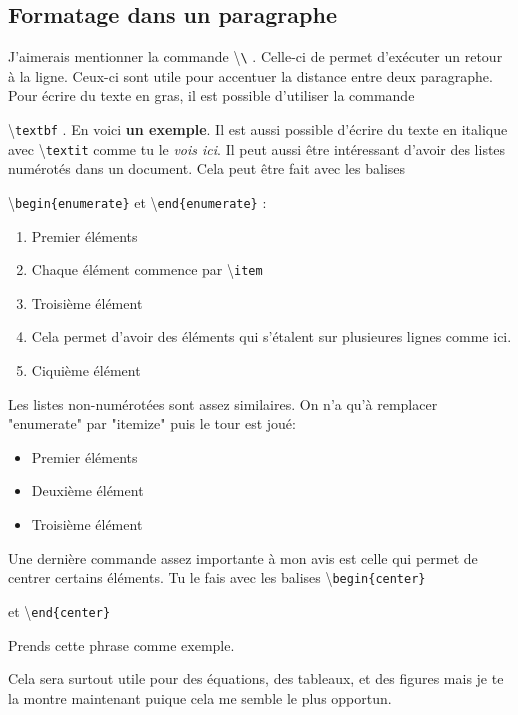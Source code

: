 \documentclass[a4paper, 10pt]{article}
\newcommand{\command}[1]{
	\colorbox{codebackground}{\scriptsize{\textbackslash}\texttt{#1}}
}
\begin{document}
\subsection{Formatage dans un paragraphe}

J'aimerais mentionner la commande \command{\textbackslash}. Celle-ci de
permet d'exécuter un retour à la ligne. Ceux-ci sont utile pour accentuer la
distance entre deux paragraphe. \\

Pour écrire du texte en gras, il est possible d'utiliser la commande
\command{textbf}. En voici \textbf{un exemple}. Il est aussi possible
d'écrire du texte en italique avec \command{textit} comme tu le
\textit{vois ici}. Il peut aussi être intéressant d'avoir des listes numérotés
dans un document. Cela peut être fait avec les balises
\command{begin\{enumerate\}} et \command{end\{enumerate\}}:

\begin{enumerate}
	\item Premier éléments
	\item Chaque élément commence par \command{item}
	\item Troisième élément
	\item Cela permet d'avoir des
		éléments qui s'étalent
		sur plusieures lignes comme ici.
	\item Ciquième élément \\
\end{enumerate}

Les listes non-numérotées sont assez similaires. On n'a qu'à remplacer
"enumerate" par "itemize" puis le tour est joué:

\begin{itemize}
	\item Premier éléments
	\item Deuxième élément
	\item Troisième élément \\
\end{itemize}

Une dernière commande assez importante à mon avis est celle qui permet de
centrer certains éléments. Tu le fais avec les balises \command{begin\{center\}}
et \command{end\{center\}}

\begin{center}
Prends cette phrase comme exemple.
\end{center}

Cela sera surtout utile pour des équations, des tableaux, et des figures
mais je te la montre maintenant puique cela me semble le plus opportun.
\end{document}
